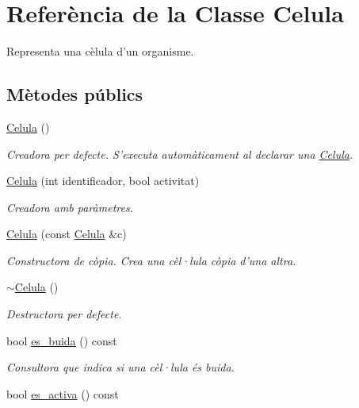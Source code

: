 \hypertarget{class_celula}{\section{Referència de la Classe Celula}
\label{class_celula}
}


Representa una cèlula d'un organisme.  


\subsection*{Mètodes públics}
\begin{DoxyCompactItemize}
\item 
\hyperlink{class_celula_a3c5017fbcec8cb564acc666aa7e21206}{Celula} ()
\begin{DoxyCompactList}\small\item\em Creadora per defecte. S'executa automàticament al declarar una \hyperlink{class_celula}{Celula}. \end{DoxyCompactList}\item 
\hyperlink{class_celula_abb139a1803c167a0cf4eb299746b7f2e}{Celula} (int identificador, bool activitat)
\begin{DoxyCompactList}\small\item\em Creadora amb paràmetres. \end{DoxyCompactList}\item 
\hyperlink{class_celula_ae46715be0b1a9b7531f54691148f88b8}{Celula} (const \hyperlink{class_celula}{Celula} \&c)
\begin{DoxyCompactList}\small\item\em Constructora de còpia. Crea una cèl·lula còpia d'una altra. \end{DoxyCompactList}\item 
\hyperlink{class_celula_aa102b024e4c8d91a2f69afa14d4e4130}{$\sim$\-Celula} ()
\begin{DoxyCompactList}\small\item\em Destructora per defecte. \end{DoxyCompactList}\item 
bool \hyperlink{class_celula_a0d5c352e0b5c3187767dbcef413b51a9}{es\-\_\-buida} () const 
\begin{DoxyCompactList}\small\item\em Consultora que indica si una cèl·lula és buida. \end{DoxyCompactList}\item 
bool \hyperlink{class_celula_a25bbae8df2eb0b60202829321175e3f7}{es\-\_\-activa} () const 

\end{DoxyCompactItemize}
